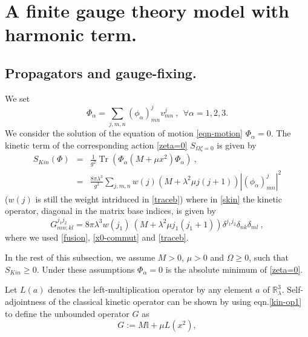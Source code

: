 \documentclass[a4paper,11pt,twoside]{article}
\numberwithin{equation}{section}
\newcommand\bbone{{ \mathbb{I}}}
\DeclareMathOperator{\tr}{Tr}
\theoremstyle{nonumberplain}
\newcounter{and}
\begin{document}

\section{A finite gauge theory model with harmonic term.}\label{section3}


\subsection{Propagators and gauge-fixing.}\label{subsection31}

We set%
%
\begin{equation}
\Phi_\alpha = \sum_{j,m,n} (\phi_\alpha)^j_{mn} v^j_{mn} \ , \ \ \forall \alpha=1,2,3.
\end{equation}
%
We consider the solution of the equation of motion \eqref{eqn-motion} $\Phi_\alpha=0$. The kinetic term of the corresponding action \eqref{zeta=0} $S_{\Omega\zeta=0}$ is given by%
%
\begin{eqnarray}
S_{Kin}(\Phi) &=& \frac{1}{g^2} \tr\left( \Phi_\alpha \left(M+\mu x^2\right) \Phi_\alpha \right) \ , \label{skin} \\
&=& \frac{8\pi\lambda^3}{g^2} \sum_{j,m,n} w(j) \left(M+\lambda^2\mu j(j+1)\right) |(\phi_\alpha)^j_{mn}|^2 \label{skin-explicit}
\end{eqnarray}
%
($w(j)$ is still the weight intriduced in \eqref{traceb}) where in \eqref{skin} the kinetic operator, diagonal in the matrix base indices, is given by%
%
\begin{equation}
G^{j_1j_2}_{mn;kl} = 8\pi\lambda^3 w(j_1) \ \left(M+\lambda^2\mu j_1(j_1+1)\right) \delta^{j_1j_2} \delta_{nk} \delta_{ml} \ , \label{kin-op1}
\end{equation}
%
where we used \eqref{fusion}, \eqref{x0-commut} and \eqref{traceb}.\par%
%
In the rest of this subsection, we assume $M>0$, $\mu>0$ and $\Omega\ge0$, such that $S_{Kin}\ge0$. Under these assumptions $\Phi_\alpha=0$ is the absolute minimum of \eqref{zeta=0}.\par%
%
Let $L(a)$ denotes the left-multiplication operator by any element $a$ of $\mathbb{R}^3_\lambda$. Self-adjointness of the classical kinetic operator can be shown by using eqn.\eqref{kin-op1} to define the unbounded operator $G$ as%
%
\begin{equation}
G:= M \bbone + \mu L(x^2) \label{kinet-harmonic},
\end{equation}
\end{document}
